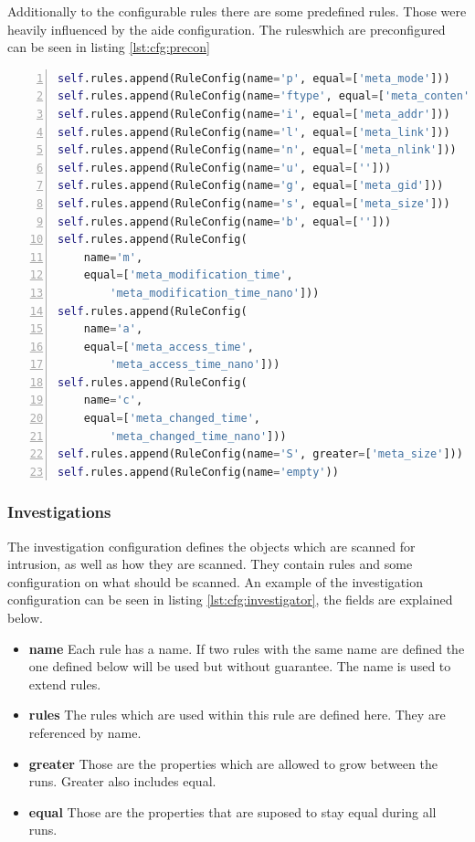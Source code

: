 Additionally to the configurable rules there are some predefined rules. Those were heavily influenced by the aide configuration. The ruleswhich are preconfigured can be seen in listing \ref{lst:cfg:precon}

\begin{lstlisting}[language=python, numbers=left, caption=Investigator Configuration, label=lst:cfg:precon]
self.rules.append(RuleConfig(name='p', equal=['meta_mode']))
self.rules.append(RuleConfig(name='ftype', equal=['meta_conten']))
self.rules.append(RuleConfig(name='i', equal=['meta_addr']))
self.rules.append(RuleConfig(name='l', equal=['meta_link']))
self.rules.append(RuleConfig(name='n', equal=['meta_nlink']))
self.rules.append(RuleConfig(name='u', equal=['']))
self.rules.append(RuleConfig(name='g', equal=['meta_gid']))
self.rules.append(RuleConfig(name='s', equal=['meta_size']))
self.rules.append(RuleConfig(name='b', equal=['']))
self.rules.append(RuleConfig(
	name='m', 
	equal=['meta_modification_time',
		'meta_modification_time_nano']))
self.rules.append(RuleConfig(
	name='a', 
	equal=['meta_access_time', 
		'meta_access_time_nano']))
self.rules.append(RuleConfig(
	name='c', 
	equal=['meta_changed_time', 
		'meta_changed_time_nano']))
self.rules.append(RuleConfig(name='S', greater=['meta_size']))
self.rules.append(RuleConfig(name='empty'))	
\end{lstlisting}

\subsubsection{Investigations}
\label{sec:config:investigations}

The investigation configuration defines the objects which are scanned for intrusion, as well as how they are scanned. They contain rules and some configuration on what should be scanned. An example of the investigation configuration can be seen in listing \ref{lst:cfg:investigator}, the fields are explained below.

\begin{itemize}
	\item \textbf{name} Each rule has a name. If two rules with the same name are defined the one defined below will be used but without guarantee. The name is used to extend rules.
	\item \textbf{rules} The rules which are used within this rule are defined here. They are referenced by name.
	\item \textbf{greater} Those are the properties which are allowed to grow between the runs. Greater also includes equal.
	\item \textbf{equal} Those are the properties that are suposed to stay equal during all runs.
\end{itemize}

